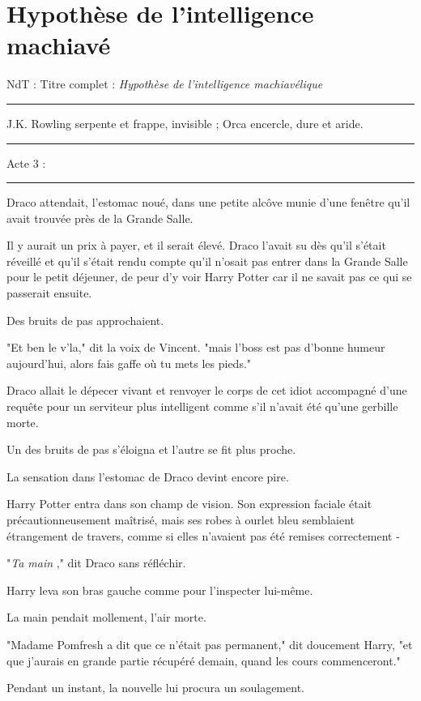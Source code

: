 
\chapter{Hypothèse de l'intelligence machiavé}

NdT : Titre complet : \emph{Hypothèse de l'intelligence machiavélique} 
\par\noindent\rule{\textwidth}{0.4pt}
J.K. Rowling serpente et frappe, invisible ; Orca encercle, dure et aride.
\par\noindent\rule{\textwidth}{0.4pt}
Acte 3 :
\par\noindent\rule{\textwidth}{0.4pt}
Draco attendait, l'estomac noué, dans une petite alcôve munie d'une fenêtre qu'il avait trouvée près de la Grande Salle.

Il y aurait un prix à payer, et il serait élevé. Draco l'avait su dès qu'il s'était réveillé et qu'il s'était rendu compte qu'il n'osait pas entrer dans la Grande Salle pour le petit déjeuner, de peur d'y voir Harry Potter car il ne savait pas ce qui se passerait ensuite.

Des bruits de pas approchaient.

"Et ben le v'la," dit la voix de Vincent. "mais l'boss est pas d'bonne humeur aujourd'hui, alors fais gaffe où tu mets les pieds."

Draco allait le dépecer vivant et renvoyer le corps de cet idiot accompagné d'une requête pour un serviteur plus intelligent comme s'il n'avait été qu'une gerbille morte.

Un des bruits de pas s'éloigna et l'autre se fit plus proche.

La sensation dans l'estomac de Draco devint encore pire.

Harry Potter entra dans son champ de vision. Son expression faciale était précautionneusement maîtrisé, mais ses robes à ourlet bleu semblaient étrangement de travers, comme si elles n'avaient pas été remises correctement -

"\emph{Ta main} ," dit Draco sans réfléchir.

Harry leva son bras gauche comme pour l'inspecter lui-même.

La main pendait mollement, l'air morte.

"Madame Pomfresh a dit que ce n'était pas permanent," dit doucement Harry, "et que j'aurais en grande partie récupéré demain, quand les cours commenceront."

Pendant un instant, la nouvelle lui procura un soulagement.

